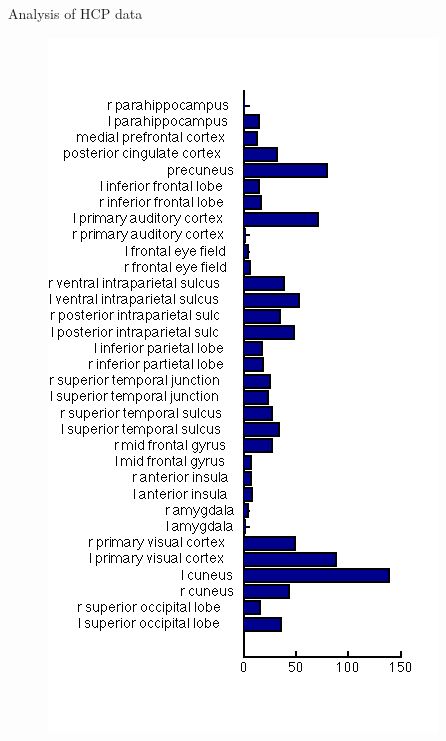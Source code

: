 \documentclass[final,hyperref={pdfpagelabels=false}]{beamer}
\begin{document}
\begin{columns}[t]
\begin{column}{.26\textwidth}
\begin{block}{Analysis of HCP data}
\begin{figure}
  		\includegraphics[trim=0 60 0 60,clip,height=.42\textheight]{pictures/poster/phase_hist.png}
		\end{figure}
  	\end{block}
  \end{column}
\end{columns}
\end{document}
